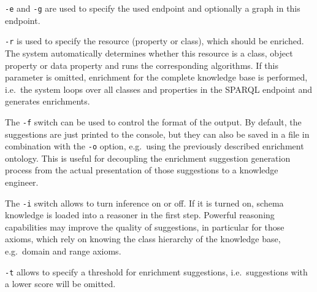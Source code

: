\documentclass[a4paper,12pt]{scrartcl}
\begin{document}
\verb|-e| and \verb|-g| are used to specify the used endpoint and optionally a graph in this endpoint.

\verb|-r| is used to specify the resource (property or class), which should be enriched.
The system automatically determines whether this resource is a class, object property or data property and runs the corresponding algorithms. If this parameter is omitted, enrichment for the complete knowledge base is performed, i.e.~the system loops over all classes and properties in the SPARQL endpoint and generates enrichments.

The \verb|-f| switch can be used to control the format of the output.
By default, the suggestions are just printed to the console, but they can also be saved in a file in combination with the \verb|-o| option, e.g.~using the previously described enrichment ontology. 
This is useful for decoupling the enrichment suggestion generation process from the actual presentation of those suggestions to a knowledge engineer.

The \verb|-i| switch allows to turn inference on or off. If it is turned on, schema knowledge is loaded into a reasoner in the first step. Powerful reasoning capabilities may improve the quality of suggestions, in particular for those axioms, which rely on knowing the class hierarchy of the knowledge base, e.g.~domain and range axioms.

\verb|-t| allows to specify a threshold for enrichment suggestions, i.e.~suggestions with a lower score will be omitted. 

\end{document}
